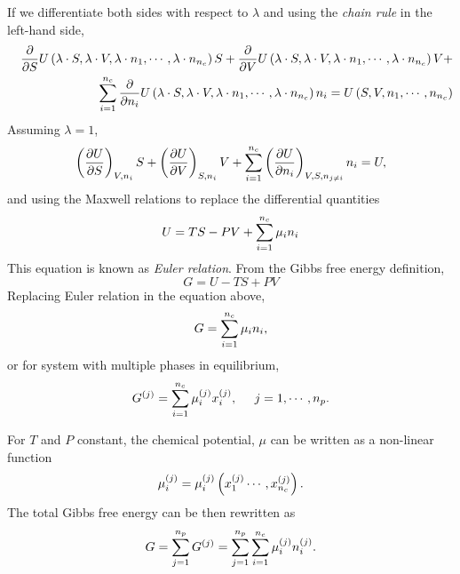 If we differentiate both sides with respect to $\lambda$ and using the {\it chain rule} in the left-hand side,
\begin{eqnarray}
  &&\frc{\partial}{\partial S} U\left(\lambda\cdot S, \lambda\cdot V,  \lambda\cdot n_{1}, \cdots, \lambda\cdot n_{n_{c}}\right)S + \frc{\partial}{\partial V} U\left(\lambda\cdot S, \lambda\cdot V,  \lambda\cdot n_{1}, \cdots, \lambda\cdot n_{n_{c}}\right)V + \nonumber \\
 && \hfill \summation_{i=1}^{n_{c}} \frc{\partial}{\partial n_{i}} U\left(\lambda\cdot S, \lambda\cdot V,  \lambda\cdot n_{1}, \cdots, \lambda\cdot n_{n_{c}}\right)n_{i} = U\left(S, V, n_{1}, \cdots, n_{n_{c}}\right) \nonumber 
\end{eqnarray}
Assuming $\lambda=1$,
\begin{displaymath}
   \Partial[U]{S}{V,n_{i}}S + \Partial[U]{V}{S,n_{i}}V + \summation_{i=1}^{n_{c}}\Partial[U]{n_{i}}{V,S,n_{j\ne i}}n_{i} = U,
\end{displaymath}
and using the Maxwell relations to replace the differential quantities
\begin{equation}
   U = TS - PV + \summation_{i=1}^{n_{c}} \mu_{i}n_{i}\label{Chapter:ThermodynamicFormulation:Eqn:EulerRelation}
\end{equation}
This equation is known as {\it Euler relation}.  From the Gibbs free energy definition,
\begin{displaymath}
   G = U-TS+PV
\end{displaymath}
Replacing Euler relation in the equation above,
\begin{equation}
   G = \summation_{i=1}^{n_{c}} \mu_{i}n_{i},
\end{equation}
or for system with multiple phases in equilibrium,
\begin{equation}
   \mfr[G]{}{j} = \summation_{i=1}^{n_{c}}\mfr[\mu]{i}{j}\mfr[x]{i}{j},\;\;\;\;\; j=1, \cdots, n_{p}.
\end{equation}

For $T$ and $P$ constant, the chemical potential, $\mu$ can be written as a non-linear function
\begin{equation}
   \mfr[\mu]{i}{j} = \mfr[\mu]{i}{j}\left(\mfr[x]{1}{j} \cdots, \mfr[x]{n_{c}}{j}\right).\label{Chapter:ThermodynamicFormulation:Eqn:ChemPotDef2}
\end{equation}
The total Gibbs free energy can be then rewritten as
\begin{equation}
   G = \summation_{j=1}^{n_{p}} \mfr[G]{}{j} = \summation_{j=1}^{n_{p}}\summation_{i=1}^{n_{c}} \mfr[\mu]{i}{j}\mfr[n]{i}{j}.\label{Chapter:ThermodynamicFormulation:Eqn:GibbsTotal}
 \end{equation}

